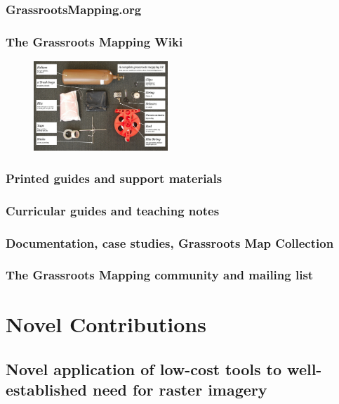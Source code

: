 \documentclass[11pt]{report}
\begin{document}
\subsubsection{GrassrootsMapping.org}
\subsubsection*{The Grassroots Mapping Wiki}
\begin{figure}
	\begin{flushright}
		\includegraphics[width=0.45\textwidth]{images/100-dollar-satellite-poster.jpg}
	\end{flushright}
\end{figure}

\subsubsection*{Printed guides and support materials}
\subsubsection*{Curricular guides and teaching notes}

\subsubsection*{Documentation, case studies, Grassroots Map Collection}
\subsubsection*{The Grassroots Mapping community and mailing list}
\section{Novel Contributions}
\subsection{Novel application of low-cost tools to well-established need for raster imagery}
\end{document}

